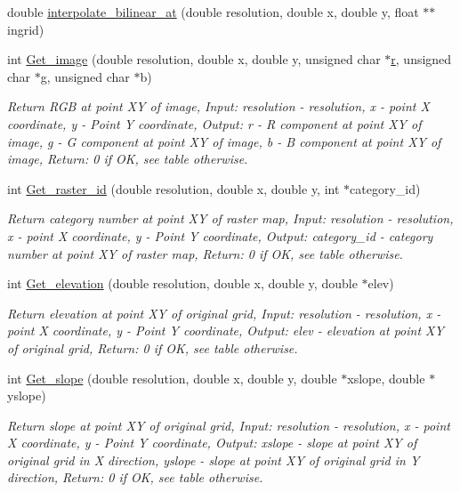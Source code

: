 \begin{CompactItemize}
double \hyperlink{GisApi_8C_a67}{interpolate\_\-bilinear\_\-at} (double resolution, double x, double y, float $\ast$$\ast$ingrid)
\item 
int \hyperlink{GisApi_8C_a68}{Get\_\-image} (double resolution, double x, double y, unsigned char $\ast$\hyperlink{hdfdefs_8h_a25}{r}, unsigned char $\ast$g, unsigned char $\ast$b)
\begin{CompactList}\small\item\em Return RGB at point XY of image, Input: resolution - resolution, x - point X coordinate, y - Point Y coordinate, Output: r - R component at point XY of image, g - G component at point XY of image, b - B component at point XY of image, Return: 0 if OK, see table otherwise. \item\end{CompactList}\item 
int \hyperlink{GisApi_8C_a69}{Get\_\-raster\_\-id} (double resolution, double x, double y, int $\ast$category\_\-id)
\begin{CompactList}\small\item\em Return category number at point XY of raster map, Input: resolution - resolution, x - point X coordinate, y - Point Y coordinate, Output: category\_\-id - category number at point XY of raster map, Return: 0 if OK, see table otherwise. \item\end{CompactList}\item 
int \hyperlink{GisApi_8C_a70}{Get\_\-elevation} (double resolution, double x, double y, double $\ast$elev)
\begin{CompactList}\small\item\em Return elevation at point XY of original grid, Input: resolution - resolution, x - point X coordinate, y - Point Y coordinate, Output: elev - elevation at point XY of original grid, Return: 0 if OK, see table otherwise. \item\end{CompactList}\item 
int \hyperlink{GisApi_8C_a71}{Get\_\-slope} (double resolution, double x, double y, double $\ast$xslope, double $\ast$yslope)
\begin{CompactList}\small\item\em Return slope at point XY of original grid, Input: resolution - resolution, x - point X coordinate, y - Point Y coordinate, Output: xslope - slope at point XY of original grid in X direction, yslope - slope at point XY of original grid in Y direction, Return: 0 if OK, see table otherwise. \item\end{CompactList}\item 
$$
\end{CompactItemize}
